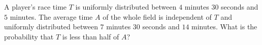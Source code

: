 A player's race time $T$ is uniformly distributed between $4$ minutes $30$ seconds and $5$ minutes. The average time $A$ of the whole field is independent of $T$ and uniformly distributed between $7$ minutes $30$ seconds and $14$ minutes. What is the probability that $T$ is less than half of $A$?
